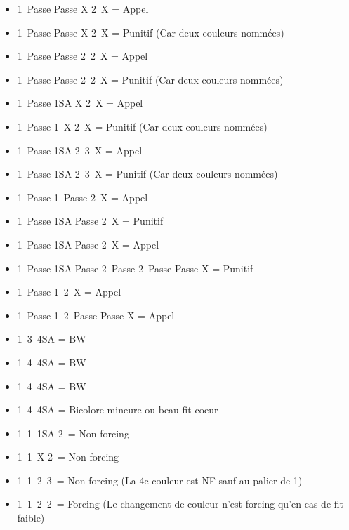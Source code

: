 \documentclass[a4paper, oneside, 11pt]{report}
\begin{document}
\begin{itemize}
	\item 1\pique\ Passe Passe X 2\pique\ X = Appel
	\item 1\pique\ Passe Passe X 2\carreau\ X = Punitif (Car deux couleurs nommées)
	\item 1\pique\ Passe Passe 2\trefle\ 2\pique\ X = Appel
	\item 1\pique\ Passe Passe 2\trefle\ 2\carreau\ X = Punitif (Car deux couleurs nommées)
	\item 1\carreau\ Passe 1SA X 2\carreau\ X = Appel
	\item 1\carreau\ Passe 1\coeur\ X 2\carreau\ X = Punitif (Car deux couleurs nommées)
	\item 1\carreau\ Passe 1SA 2\pique\ 3\carreau\ X = Appel
	\item 1\carreau\ Passe 1SA 2\pique\ 3\trefle\ X = Punitif (Car deux couleurs nommées)\\

	\item 1\coeur\ Passe 1\pique\ Passe 2\coeur\ X = Appel
	\item 1\coeur\ Passe 1SA Passe 2\coeur\ X = Punitif
	\item 1\coeur\ Passe 1SA Passe 2\trefle\ X  = Appel
	\item 1\coeur\ Passe 1SA Passe 2\trefle\ Passe 2\coeur\ Passe Passe X  = Punitif\\

	\item 1\carreau\ Passe 1\coeur\ 2\coeur\ X = Appel
	\item 1\carreau\ Passe 1\coeur\ 2\coeur\ Passe Passe X = Appel\\

	\item 1\coeur\ 3\pique\ 4SA = BW \coeur
	\item 1\coeur\ 4\carreau\ 4SA = BW \coeur
	\item 1\pique\ 4\coeur\ 4SA = BW \pique
	\item 1\coeur\ 4\pique\ 4SA = Bicolore mineure ou beau fit coeur\\

	\item 1\trefle\ 1\pique\ 1SA 2\carreau\ = Non forcing
	\item 1\trefle\ 1\pique\ X 2\carreau\ = Non forcing
	\item 1\trefle\ 1\pique\ 2\coeur\ 3\carreau\ = Non forcing (La 4e couleur est NF sauf au palier de 1)
	\item 1\trefle\ 1\pique\ 2\trefle\ 2\carreau\ = Forcing (Le changement de couleur n'est forcing qu'en cas de fit faible)\\
	\end{itemize}
\end{document}
